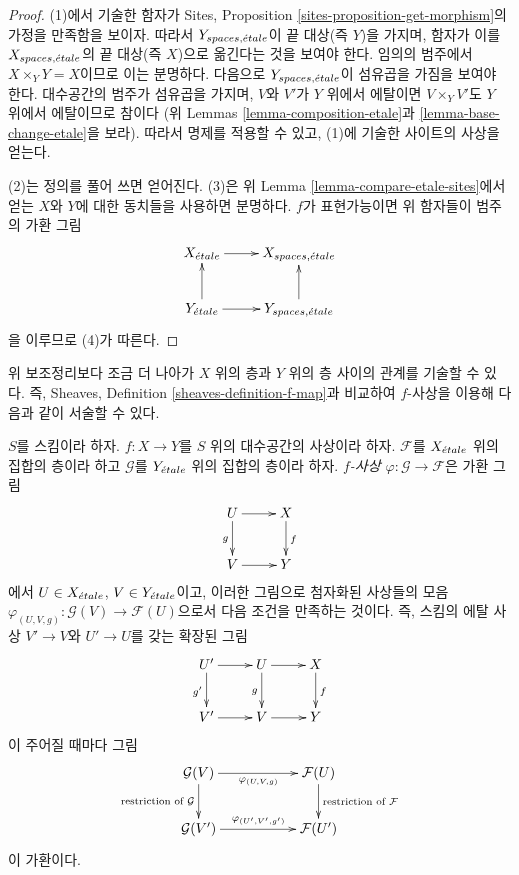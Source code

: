 \begin{proof}
(1)에서 기술한 함자가 Sites, Proposition
\ref{sites-proposition-get-morphism}의 가정을 만족함을 보이자.
따라서 $Y_{spaces, {\acute{e}tale}}$이 끝 대상(즉 $Y$)을 가지며,
함자가 이를 $X_{spaces, {\acute{e}tale}}$의 끝 대상(즉 $X$)으로
옮긴다는 것을 보여야 한다. 임의의 범주에서
$X \times_Y Y = X$이므로 이는 분명하다.
다음으로 $Y_{spaces, {\acute{e}tale}}$이 섬유곱을 가짐을 보여야 한다.
대수공간의 범주가 섬유곱을 가지며, $V$와 $V'$가 $Y$ 위에서 에탈이면
$V \times_Y V'$도 $Y$ 위에서 에탈이므로 참이다
(위 Lemmas \ref{lemma-composition-etale}과
\ref{lemma-base-change-etale}을 보라).
따라서 명제를 적용할 수 있고, (1)에 기술한 사이트의 사상을 얻는다.

\medskip\noindent
(2)는 정의를 풀어 쓰면 얻어진다.
(3)은 위 Lemma \ref{lemma-compare-etale-sites}에서 얻는
$X$와 $Y$에 대한 동치들을 사용하면 분명하다.
$f$가 표현가능이면 위 함자들이 범주의 가환 그림
$$
\xymatrix{
X_\etale \ar[r] &
X_{spaces, \etale} \\
Y_\etale \ar[r] \ar[u] &
Y_{spaces, \etale} \ar[u]
}
$$
을 이루므로 (4)가 따른다.
\end{proof}
\noindent
위 보조정리보다 조금 더 나아가 $X$ 위의 층과 $Y$ 위의 층 사이의
관계를 기술할 수 있다.
즉, Sheaves, Definition \ref{sheaves-definition-f-map}과 비교하여
$f$-사상을 이용해 다음과 같이 서술할 수 있다.

\begin{definition}
\label{definition-f-map}
$S$를 스킴이라 하자.
$f : X \to Y$를 $S$ 위의 대수공간의 사상이라 하자.
$\mathcal{F}$를 $X_{\acute{e}tale}$ 위의 집합의 층이라 하고
$\mathcal{G}$를 $Y_{\acute{e}tale}$ 위의 집합의 층이라 하자.
{\it $f$-사상 $\varphi : \mathcal{G} \to \mathcal{F}$}은
가환 그림
$$
\xymatrix{
U \ar[d]_g \ar[r] & X \ar[d]^f \\
V \ar[r] & Y
}
$$
에서 $U \in X_{\acute{e}tale}$, $V \in Y_{\acute{e}tale}$이고,
이러한 그림으로 첨자화된 사상들의 모음
$\varphi_{(U, V, g)} : \mathcal{G}(V) \to \mathcal{F}(U)$으로서
다음 조건을 만족하는 것이다. 즉, 스킴의 에탈 사상
$V' \to V$와 $U' \to U$를 갖는 확장된 그림
$$
\xymatrix{
U' \ar[r] \ar[d]_{g'} & U \ar[d]_g \ar[r] & X \ar[d]^f \\
V' \ar[r] & V \ar[r] & Y
}
$$
이 주어질 때마다 그림
$$
\xymatrix{
\mathcal{G}(V)
\ar[rr]_{\varphi_{(U, V, g)}}
\ar[d]_{\text{restriction of }\mathcal{G}} & &
\mathcal{F}(U)
\ar[d]^{\text{restriction of }\mathcal{F}} \\
\mathcal{G}(V')
\ar[rr]^{\varphi_{(U', V', g')}} & &
\mathcal{F}(U')
}
$$
이 가환이다.
\end{definition}

